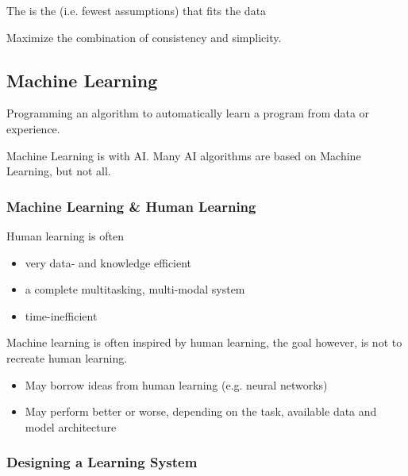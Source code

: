 \documentclass[
../EiKI_Summary.tex,
]
{subfiles}
\begin{document}
\begin{minipage}
    [t]{0.5\textwidth}
    \begin{defbox}
        The  is the  (i.e. fewest assumptions) that fits the data
    \end{defbox}
\end{minipage}
\begin{minipage}
    [t]{0.5\textwidth}
    \begin{defbox}
        Maximize the combination of consistency and simplicity.
    \end{defbox}
\end{minipage}

\subsection{Machine Learning}
Programming an algorithm to automatically learn a program from data or experience.

Machine Learning is  with AI. Many AI algorithms are based on Machine Learning, but not all. 

\subsubsection{Machine Learning \& Human Learning}
Human learning is often
\begin{itemize}
    \item very data- and knowledge efficient
    \item a complete multitasking, multi-modal system
    \item time-inefficient
\end{itemize}

Machine learning is often inspired by human learning, the goal however, is not to recreate human learning.
\begin{itemize}
    \item May borrow ideas from human learning (e.g. neural networks)
    \item May perform better or worse, depending on the task, available data and model architecture
\end{itemize}

\subsubsection{Designing a Learning System}
\end{document}
